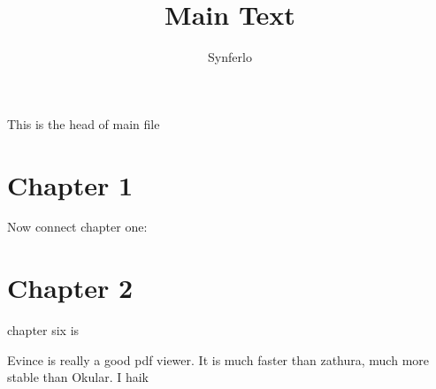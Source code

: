 \documentclass[12pt]{article}
\title{Main Text}
\author{Synferlo}
\date{}
\begin{document}
\maketitle

This is the head of main file


\section{Chapter 1}
Now connect chapter one:



\section{Chapter 2}

chapter six is 




Evince is really a good pdf viewer. It is much faster than zathura, much more stable
than Okular. I haik






















\end{document}

